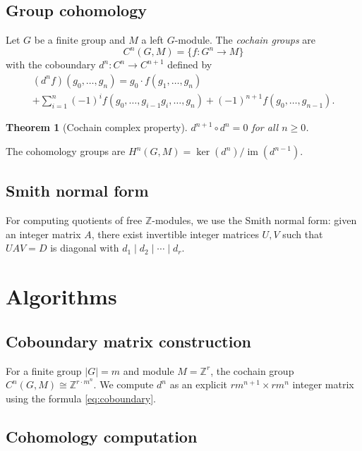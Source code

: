 \documentclass[11pt,a4paper]{article}
\newtheorem{theorem}{Theorem}[section]
\theoremstyle{definition}
\theoremstyle{remark}
\DeclareMathOperator{\im}{im}
\begin{document}
\subsection{Group cohomology}

Let $G$ be a finite group and $M$ a left $G$-module. The \emph{cochain groups} are
\[
  C^n(G, M) = \{ f: G^n \to M \}
\]
with the coboundary $d^n: C^n \to C^{n+1}$ defined by
\begin{multline}\label{eq:coboundary}
  (d^n f)(g_0, \ldots, g_n) = g_0 \cdot f(g_1, \ldots, g_n) \\
  + \sum_{i=1}^{n} (-1)^i f(g_0, \ldots, g_{i-1}g_i, \ldots, g_n)
  + (-1)^{n+1} f(g_0, \ldots, g_{n-1}).
\end{multline}

\begin{theorem}[Cochain complex property]
  $d^{n+1} \circ d^n = 0$ for all $n \geq 0$.
\end{theorem}

The cohomology groups are $H^n(G, M) = \ker(d^n) / \im(d^{n-1})$.

\subsection{Smith normal form}

For computing quotients of free $\mathbb{Z}$-modules, we use the
Smith normal form: given an integer matrix $A$, there exist invertible
integer matrices $U, V$ such that $UAV = D$ is diagonal with
$d_1 \mid d_2 \mid \cdots \mid d_r$.

\section{Algorithms}\label{sec:algorithms}

\subsection{Coboundary matrix construction}

For a finite group $|G| = m$ and module $M = \mathbb{Z}^r$, the cochain
group $C^n(G, M) \cong \mathbb{Z}^{r \cdot m^n}$. We compute $d^n$ as
an explicit $r m^{n+1} \times r m^n$ integer matrix using the formula
\eqref{eq:coboundary}.

\subsection{Cohomology computation}
\end{document}
